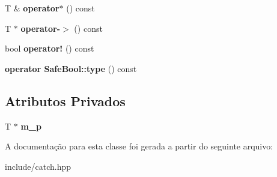 \begin{DoxyCompactItemize}
\item 
T \& {\bfseries operator$\ast$} () const \hypertarget{classCatch_1_1Ptr_a3a4c139032a8bd1bffa553103d5dbfd3}{}\label{classCatch_1_1Ptr_a3a4c139032a8bd1bffa553103d5dbfd3}

\item 
T $\ast$ {\bfseries operator-\/$>$} () const \hypertarget{classCatch_1_1Ptr_afaa13250d5e0ae5a440726d5e5aa7295}{}\label{classCatch_1_1Ptr_afaa13250d5e0ae5a440726d5e5aa7295}

\item 
bool {\bfseries operator!} () const \hypertarget{classCatch_1_1Ptr_aea1a99ded6d62423ccb9173fab91b56e}{}\label{classCatch_1_1Ptr_aea1a99ded6d62423ccb9173fab91b56e}

\item 
{\bfseries operator Safe\+Bool\+::type} () const \hypertarget{classCatch_1_1Ptr_a27234c04feec43ffe0fd08e045557448}{}\label{classCatch_1_1Ptr_a27234c04feec43ffe0fd08e045557448}

\end{DoxyCompactItemize}
\subsection*{Atributos Privados}
\begin{DoxyCompactItemize}
\item 
T $\ast$ {\bfseries m\+\_\+p}\hypertarget{classCatch_1_1Ptr_ae7e3bd2f80b8b0bb3ace39316e7bf3a2}{}\label{classCatch_1_1Ptr_ae7e3bd2f80b8b0bb3ace39316e7bf3a2}

\end{DoxyCompactItemize}


A documentação para esta classe foi gerada a partir do seguinte arquivo\+:\begin{DoxyCompactItemize}
\item 
include/catch.\+hpp\end{DoxyCompactItemize}
